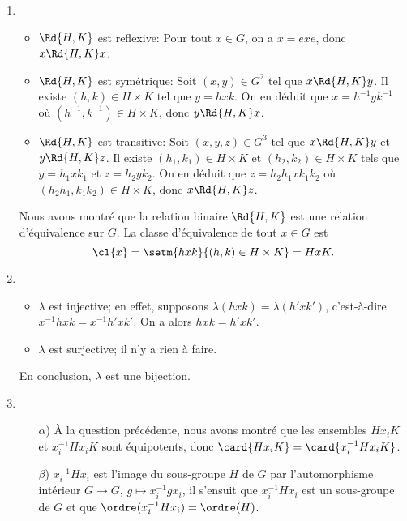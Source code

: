 \begin{enumerate}
  \item
    \begin{itemize}
      \item   
        $\Rd{H,K}$ est reflexive:
        Pour tout $x\in G$, on a $x = exe$, donc $x \Rd{H,K} x$.

      \item
        $\Rd{H,K}$ est symétrique:
        Soit $(x,y)\in G^2$ tel que $x \Rd{H,K} y$. Il existe $(h,k)\in
        H\times K$ tel que $y = hxk$. On en déduit que $x = h^{-1}yk^{-1}$ où
        $(h^{-1},k^{-1})\in H\times K$, donc $y \Rd{H,K} x$.

      \item
        $\Rd{H,K}$ est transitive:
        Soit $(x,y,z)\in G^3$ tel que $x \Rd{H,K} y$ et $y \Rd{H,K} z$. Il
        existe $(h_1,k_1)\in H\times K$ et $(h_2,k_2)\in H\times K$ tels que
        $y = h_1xk_1$ et $z = h_2yk_2$. On en déduit que $z = h_2h_1xk_1k_2$ où
        $(h_2h_1,k_1k_2)\in H\times K$, donc $x \Rd{H,K} z$.
    \end{itemize}

    Nous avons montré que la relation binaire $\Rd{H,K}$ est une relation
    d'équivalence sur $G$. La classe d'équivalence de tout $x\in G$ est
    \[
      \cl{x} = \setm{hxk}{(h,k)\in H\times K} = HxK.
    \]

  \item
    \begin{itemize}
      \item
        $\lambda$ est injective; en effet, supposons
        $\lambda(hxk) = \lambda(h'xk')$, c'est-à-dire
        $x^{-1}hxk = x^{-1}h'xk'$. On a alors $hxk = h'xk'$. 

      \item
        $\lambda$ est surjective; il n'y a rien à faire.
    \end{itemize}

    En conclusion, $\lambda$ est une bijection.

  \item
    \begin{enumerate}
      \item[$\alpha$)]
        À la question précédente, nous avons montré que les ensembles 
        $Hx_iK$ et $x_i^{-1}Hx_iK$ sont équipotents, donc 
        $\card{Hx_iK} = \card{x_i^{-1}Hx_iK}$.

      \item[$\beta$)]
        $x_i^{-1}Hx_i$ est l'image du sous-groupe $H$ de $G$ par l'automorphisme
        intérieur $G\to G$, $g\mapsto x_i^{-1}gx_i$, il s'ensuit que
        $x_i^{-1}Hx_i$ est un sous-groupe de $G$ et que
        $\ordre(x_i^{-1}Hx_i)=\ordre(H)$.


\end{enumerate}
\end{enumerate}
